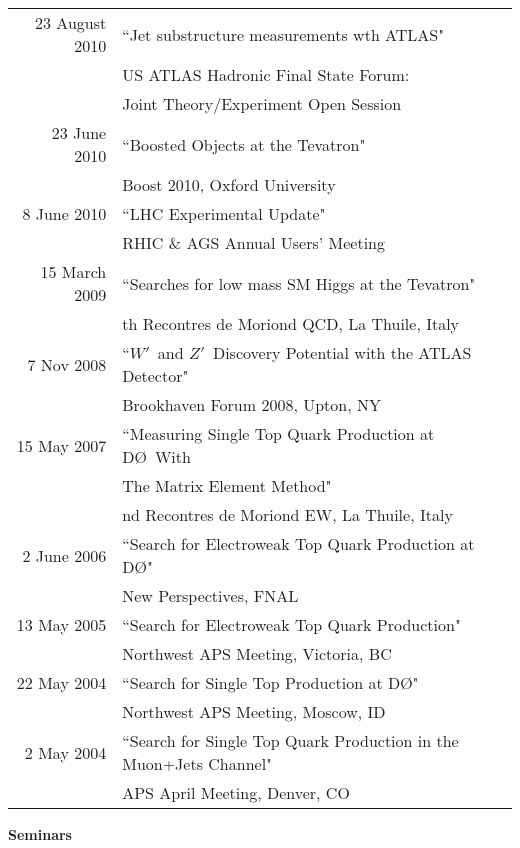 \documentclass[12pt]{article}
\newcommand{\dzero}{D\O}
\begin{document}
\begin{tabular}{rl}
23 August 2010	& 	``Jet substructure measurements wth ATLAS" \\
				&	US ATLAS Hadronic Final State Forum: \\
				&	Joint Theory/Experiment Open Session \\
23 June 2010		&	``Boosted Objects at the Tevatron"\\
				&	Boost 2010, Oxford University	\\
8 June 2010		&	``LHC Experimental Update" \\
				&	RHIC \& AGS Annual Users' Meeting \\
15 March 2009		&	``Searches for low mass SM Higgs at the Tevatron" \\
				&	{\sc{XLIV}}th Recontres de Moriond QCD, La Thuile, Italy \\
7 Nov 2008		&	``$W'$~and $Z'$~Discovery Potential with the ATLAS Detector"\\
				&	Brookhaven Forum 2008, Upton, NY\\
15 May 2007		&	``Measuring Single Top Quark Production at \dzero~With\\
				&	 The Matrix Element Method"\\
				&	{\sc{XLII}}nd Recontres de Moriond EW, La Thuile, Italy \\
2 June 2006		&	``Search for Electroweak Top Quark Production at \dzero" \\
				&	New Perspectives, FNAL \\
13 May 2005		&	``Search for Electroweak Top Quark Production" \\
				&	Northwest APS Meeting, Victoria, BC \\
22 May 2004		&	``Search for Single Top Production at \dzero" \\
				&	Northwest APS Meeting, Moscow, ID \\
2 May 2004		&	``Search for Single Top Quark Production in the Muon+Jets Channel" \\
				&	APS April Meeting, Denver, CO \\
\end{tabular}


\noindent
{\Large \textbf{Seminars}}
\end{document}
